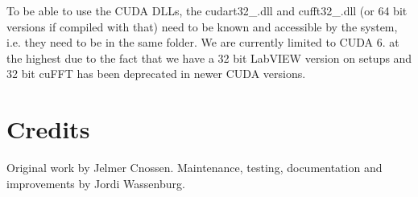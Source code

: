 To be able to use the C\+U\+DA D\+L\+Ls, the cudart32\+\_.\+dll and cufft32\+\_.\+dll (or 64 bit versions if compiled with that) need to be known and accessible by the system, i.\+e. they need to be in the same folder. We are currently limited to C\+U\+DA 6. at the highest due to the fact that we have a 32 bit Lab\+V\+I\+EW version on setups and 32 bit cu\+F\+FT has been deprecated in newer C\+U\+DA versions.\hypertarget{index_cred_sec}{}\section{Credits}\label{index_cred_sec}
Original work by Jelmer Cnossen. Maintenance, testing, documentation and improvements by Jordi Wassenburg. 